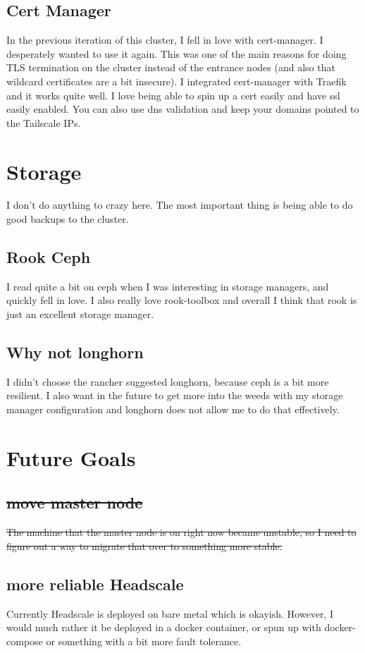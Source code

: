 \documentclass[12pt]{article}
\begin{document}
\subsection{Cert Manager}
In the previous iteration of this cluster, I fell in love with cert-manager. I desperately wanted to use it again. This was one of the main reasons for doing TLS termination on the cluster instead of the entrance nodes (and also that wildcard certificates are a bit insecure). I integrated cert-manager with Traefik and it works quite well. I love being able to spin up a cert easily and have ssl easily enabled. You can also use dns validation and keep your domains pointed to the Tailscale IPs.

\section{Storage}
I don't do anything to crazy here. The most important thing is being able to do good backups to the cluster.

\subsection{Rook Ceph}
I read quite a bit on ceph when I was interesting in storage managers, and quickly fell in love. I also really love rook-toolbox and overall I think that rook is just an excellent storage manager.

\subsection{Why not longhorn}
I didn't choose the rancher suggested longhorn, because ceph is a bit more resilient. I also want in the future to get more into the weeds with my storage manager configuration and longhorn does not allow me to do that effectively.


\section{Future Goals}
\subsection{\sout{move master node}}
\sout{The machine that the master node is on right now became unstable, so I need to figure out a way to migrate that over to something more stable.}

\subsection{more reliable Headscale}
Currently Headscale is deployed on bare metal which is okayish. However, I would much rather it be deployed in a docker container, or spun up with docker-compose or something with a bit more fault tolerance.
\end{document}

